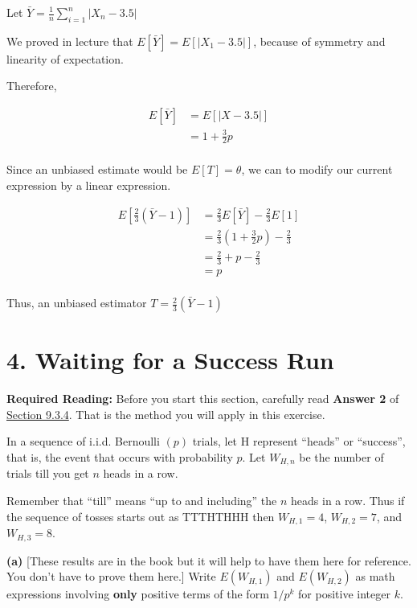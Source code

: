 \documentclass{report}
\begin{document}
Let $ \bar Y = \frac{1}{n} \sum_{i=1}^{n} |X_n-3.5| $ 

We proved in lecture that $ E[\bar Y] = E[|X_1 - 3.5|] $, because of symmetry and linearity of expectation. 

Therefore, 

\begin{align*}
	E[\bar Y] &= E[\vert X - 3.5 \vert ] \\ 
	&= 1 + \frac{3}{2} p \\
\end{align*}

Since an unbiased estimate would be $ E[T] = \theta $, we can to modify our current expression by a linear expression. 

\begin{align*}
	E[\frac{2}{3}(\bar Y-1)] &= \frac{2}{3} E[\bar Y] - \frac{2}{3} E[1] \\
	&= \frac{2}{3} (1+\frac{3}{2}p) - \frac{2}{3} \\
	&= \frac{2}{3} + p - \frac{2}{3} \\
	&=  p \\
\end{align*}

Thus, an unbiased estimator $ \boxed{T = \frac{2}{3} (\bar Y  - 1)}$

\newpage
\section*{4. Waiting for a Success
Run}\label{waiting-for-a-success-run}

\textbf{Required Reading:} Before you start this section, carefully read
\textbf{Answer 2} of
\href{https://data140.org/textbook/content/chapter-09/expected-waiting-times/\#waiting-till-hh}{Section
9.3.4}. That is the method you will apply in this exercise.

In a sequence of i.i.d. Bernoulli \((p)\) trials, let H represent
``heads'' or ``success'', that is, the event that occurs with
probability \(p\). Let \(W_{H,n}\) be the number of trials till you get
\(n\) heads in a row.

Remember that ``till'' means ``up to and including'' the \(n\) heads in
a row. Thus if the sequence of tosses starts out as TTTHTHHH then
\(W_{H,1} = 4\), \(W_{H,2} = 7\), and \(W_{H,3} = 8\).

\textbf{(a)} {[}These results are in the book but it will help to have
them here for reference. You don't have to prove them here.{]} Write
\(E(W_{H,1})\) and \(E(W_{H,2})\) as math expressions involving
\textbf{only} positive terms of the form \(1/p^k\) for positive integer
\(k\).
\end{document}

